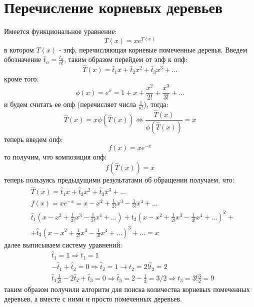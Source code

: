 \section{Перечисление корневых деревьев}

Имеется функциональное уравнение:
\begin{equation}
	T\left(x\right) = xe^{T\left(x\right)}
\end{equation}
в котором $T\left(x\right)$ - эпф, перечисляющая корневые помеченные деревья. Введем обозначение $\hat t_n = \frac{t_n}{n!}$, таким образом перейдем от эпф к опф:
\[
	\hat T\left(x\right) = \hat t_1 x + \hat t_2 x^2 + \hat t_3 x^3 + ...
\]
кроме того:
\[
	\phi\left(x\right) = e^x = 1+x+\frac{x^2}{2!} + \frac{x^3}{3!} + ...
\]
и будем считать ее опф (перечисляет числа $\frac{1}{n!}$), тогда:
\[
	\hat T\left(x\right) = x \phi\left(\hat T\left(x\right)\right) \Leftrightarrow \frac{\hat T\left(x\right)}{\phi\left(\hat T\left(x\right)\right)} = x
\]
теперь введем опф:
\[
	f\left(x\right) = xe^{-x}
\]
то получим, что композиция опф:
\[
	f\left(\hat T\left(x\right)\right) = x
\]
теперь пользуясь предыдущими результатами об обращении получаем, что:
\[
	\begin{split}
		& \hat T\left(x\right) = \hat t_1 x + \hat t_2 x^2 + \hat t_3 x^3 + ... \\
		& f\left(x\right) = xe^{-x} = x - x^2 + \frac{1}{2!}x^3 - \frac{1}{3!}x^4 + ... \\
		& \hat t_1 \left(x-x^2+\frac{1}{2!}x^3 - \frac{1}{3!}x^4 + ...\right) + t_2\left(x-x^2 + \frac{1}{2!}x^3-\frac{1}{3!}x^4+...\right)^2 + \\
		& + \hat t_3\left(x-x^2+\frac{1}{2!}x^3-\frac{1}{3!}x^4+...\right)^3 + ... = x
	\end{split}
\]
далее выписываем систему уравнений:
\[
	\begin{split}
		& \hat t_1 = 1 \Rightarrow t_1 = 1\\
		& -\hat t_1 + \hat t_2 = 0 \Rightarrow \hat t_2 = 1 \rightarrow t_2 = 2!\hat t_2 = 2 \\
		& \hat t_1 \frac{1}{2!} - 2 \hat t_2 + \hat t_3 = 0 \Rightarrow \hat t_3 = 2 - \frac{1}{2} = 3/2 \Rightarrow t_3 = 3! \frac{3}{2} = 9
	\end{split}
\]
таким образом получили алгоритм для поиска количества корневых помеченных деревьев, а вместе с ними и просто помеченных деревьев.

